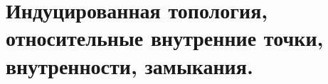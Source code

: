 \documentclass[../main.tex]{subfiles}
\begin{document}
\newpage
\section{Индуцированная топология, относительные внутренние точки, внутренности, замыкания.}
\end{document}
